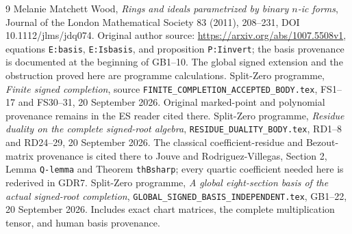 \documentclass[10pt]{article}
\begin{document}
\begin{thebibliography}{9}
 Melanie Matchett Wood,
\emph{Rings and ideals parametrized by binary $n$-ic forms},
Journal of the London Mathematical Society 83 (2011), 208--231,
DOI 10.1112/jlms/jdq074. Original author source:
\url{https://arxiv.org/abs/1007.5508v1}, equations
\texttt{E:basis}, \texttt{E:Isbasis}, and proposition
\texttt{P:Iinvert}; the basis provenance is documented at
the beginning of GB1--10. The global signed extension and
the obstruction proved here are programme calculations.
 Split-Zero programme,
\emph{Finite signed completion}, source
\texttt{FINITE\_COMPLETION\_ACCEPTED\_BODY.tex},
FS1--17 and FS30--31, 20 September 2026. Original marked-point
and polynomial provenance remains in the ES reader cited there.
 Split-Zero programme,
\emph{Residue duality on the complete signed-root algebra},
\texttt{RESIDUE\_DUALITY\_BODY.tex}, RD1--8 and RD24--29,
20 September 2026. The classical coefficient-residue and
Bezout-matrix provenance is cited there to Jouve and
Rodriguez-Villegas, Section 2, Lemma \texttt{Q-lemma} and
Theorem \texttt{thBsharp}; every quartic coefficient needed
here is rederived in GDR7.
 Split-Zero programme,
\emph{A global eight-section basis of the actual signed-root
completion}, \texttt{GLOBAL\_SIGNED\_BASIS\_INDEPENDENT.tex},
GB1--22, 20 September 2026. Includes exact chart matrices,
the complete multiplication tensor, and human basis provenance.
\end{thebibliography}
\end{document}

